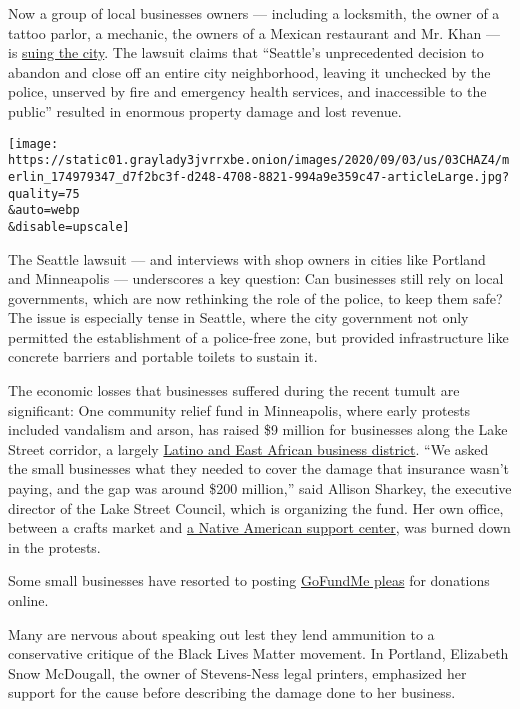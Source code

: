 Now a group of local businesses owners --- including a locksmith, the
owner of a tattoo parlor, a mechanic, the owners of a Mexican restaurant
and Mr. Khan --- is
\href{https://www.seattletimes.com/seattle-news/capitol-hill-residents-and-businesses-sue-city-of-seattle-for-failing-to-disband-chop/}{suing
the city}. The lawsuit claims that ``Seattle's unprecedented decision to
abandon and close off an entire city neighborhood, leaving it unchecked
by the police, unserved by fire and emergency health services, and
inaccessible to the public'' resulted in enormous property damage and
lost revenue.

\texttt{[image: https://static01.graylady3jvrrxbe.onion/images/2020/09/03/us/03CHAZ4/merlin\_174979347\_d7f2bc3f-d248-4708-8821-994a9e359c47-articleLarge.jpg?quality=75\\\&auto=webp\\\&disable=upscale]}

The Seattle lawsuit --- and interviews with shop owners in cities like
Portland and Minneapolis --- underscores a key question: Can businesses
still rely on local governments, which are now rethinking the role of
the police, to keep them safe? The issue is especially tense in Seattle,
where the city government not only permitted the establishment of a
police-free zone, but provided infrastructure like concrete barriers and
portable toilets to sustain it.

The economic losses that businesses suffered during the recent tumult
are significant: One community relief fund in Minneapolis, where early
protests included vandalism and arson, has raised \$9 million for
businesses along the Lake Street corridor, a largely
\href{http://www2.minneapolismn.gov/ncr/engagement/WCMS1P-143470}{Latino
and East African business district}. ``We asked the small businesses
what they needed to cover the damage that insurance wasn't paying, and
the gap was around \$200 million,'' said Allison Sharkey, the executive
director of the Lake Street Council, which is organizing the fund. Her
own office, between a crafts market and \href{https://www.diw-mn.org/}{a
Native American support center}, was burned down in the protests.

Some small businesses have resorted to posting
\href{https://www.gofundme.com/f/1101-e-lake-street-minneapolis-mn}{GoFundMe
pleas} for donations online.

Many are nervous about speaking out lest they lend ammunition to a
conservative critique of the Black Lives Matter movement. In Portland,
Elizabeth Snow McDougall, the owner of Stevens-Ness legal printers,
emphasized her support for the cause before describing the damage done
to her business.

